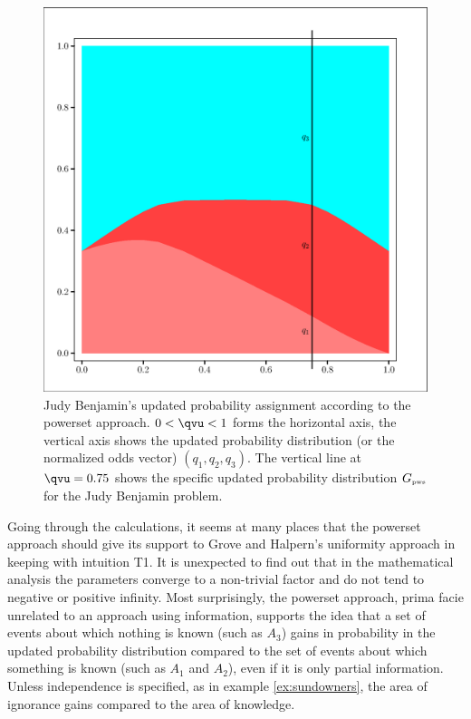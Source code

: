 \documentclass[phd,12pt,oneside]{ubcthesis}
\begin{document}
\begin{figure}[ht!]
    \begin{minipage}[h]{.7\linewidth}
      \includegraphics[width=\textwidth]{zeroone-pwst.eps}
      \caption{\footnotesize Judy Benjamin's updated probability
        assignment according to the powerset approach. $0<{\qvu}<1$
        forms the horizontal axis, the vertical axis shows the updated
        probability distribution (or the normalized odds vector)
        $(q_{1},q_{2},q_{3})$. The vertical line at ${\qvu}=0.75$
        shows the specific updated probability distribution
        $G_{\mbox{\tiny pws}}$ for the Judy Benjamin problem.}
      \label{fig:pwst}
    \end{minipage}
\end{figure}

Going through the calculations, it seems at many places that the
powerset approach should give its support to Grove and Halpern's
uniformity approach in keeping with intuition T1. It is unexpected to
find out that in the mathematical analysis the parameters converge to
a non-trivial factor and do not tend to negative or positive infinity.
Most surprisingly, the powerset approach, prima facie unrelated to an
approach using information, supports the idea that a set of events
about which nothing is known (such as $A_{3}$) gains in probability in
the updated probability distribution compared to the set of events
about which something is known (such as $A_{1}$ and $A_{2}$), even if
it is only partial information. Unless independence is specified, as
in example \ref{ex:sundowners}, the area of ignorance gains compared
to the area of knowledge.
\end{document}
